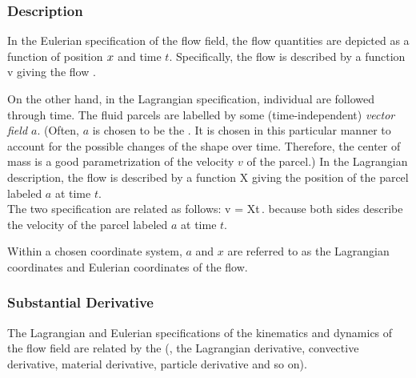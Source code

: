 \subsubsection{Description}
In the Eulerian specification of the flow field, the flow quantities are depicted as a function of position $x$ and time $t$. Specifically, the flow is described by a function
\beq
v
\eeq
giving the flow .

On the other hand, in the Lagrangian specification, individual  are followed through time. The fluid parcels are labelled by some (time-independent) \emph{vector field $a$}. (Often, $a$ is chosen to be the . It is chosen in this particular manner to account for the possible changes of the shape over time. Therefore, the center of mass is a good parametrization of the velocity $v$ of the parcel.) In the Lagrangian description, the flow is described by a function
\beq
X
\eeq
giving the position of the parcel labeled $a$ at time $t$.\\

The two specification are related as follows:
\beq
v = \cder Xt\,.
\eeq
because both sides describe the velocity of the parcel labeled $a$ at time $t$.

Within a chosen coordinate system, $a$ and $x$ are referred to as the Lagrangian coordinates and Eulerian coordinates of the flow.

\subsubsection{Substantial Derivative}
The Lagrangian and Eulerian specifications of the kinematics and dynamics of the flow field are related by the  (\aka, the Lagrangian derivative, convective derivative, material derivative, particle derivative and so on).

